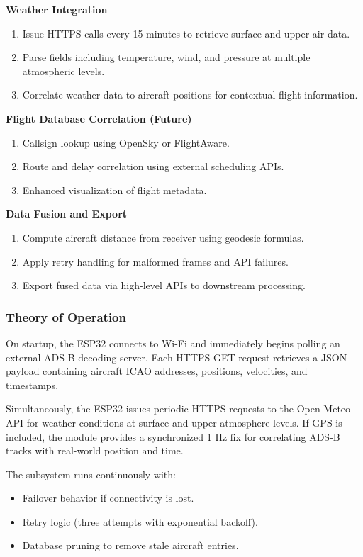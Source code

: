 \textbf{Weather Integration}
\begin{enumerate}
    \item Issue HTTPS calls every 15 minutes to retrieve surface and upper-air data.
    \item Parse fields including temperature, wind, and pressure at multiple atmospheric levels.
    \item Correlate weather data to aircraft positions for contextual flight information.
\end{enumerate}

\textbf{Flight Database Correlation (Future)}
\begin{enumerate}
    \item Callsign lookup using OpenSky or FlightAware.
    \item Route and delay correlation using external scheduling APIs.
    \item Enhanced visualization of flight metadata.
\end{enumerate}

\textbf{Data Fusion and Export}
\begin{enumerate}
    \item Compute aircraft distance from receiver using geodesic formulas.
    \item Apply retry handling for malformed frames and API failures.
    \item Export fused data via high-level APIs to downstream processing.
\end{enumerate}

\subsubsection{Theory of Operation}
On startup, the ESP32 connects to Wi-Fi and immediately begins polling an external ADS-B decoding server. Each HTTPS GET request retrieves a JSON payload containing aircraft ICAO addresses, positions, velocities, and timestamps.

Simultaneously, the ESP32 issues periodic HTTPS requests to the Open-Meteo API for weather conditions at surface and upper-atmosphere levels. If GPS is included, the module provides a synchronized 1 Hz fix for correlating ADS-B tracks with real-world position and time.

The subsystem runs continuously with:
\begin{itemize}
    \item Failover behavior if connectivity is lost.
    \item Retry logic (three attempts with exponential backoff).
    \item Database pruning to remove stale aircraft entries.
\end{itemize}

